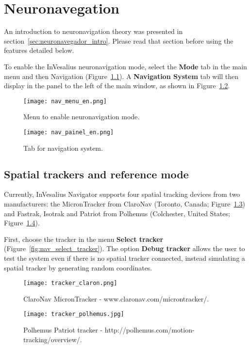 \chapter{Neuronavegation}
\label{sec:neuronavegador}

An introduction to neuronavigation theory was presented in section~\ref{sec:neuronavegador_intro}. Please read that section before using the features detailed below.

To enable the InVesalius neuronavigation mode, select the \textbf{Mode} tab in the main menu and then Navigation (Figure~\ref{fig:nav_menu_en}). A \textbf{Navigation System} tab will then display in the panel to the left of the main window, as shown in Figure~\ref{fig:nav_painel_en}.

\begin{figure}[!htb]
\centering
\texttt{[image: nav\_menu\_en.png]}
\caption{Menu to enable neuronavigation mode.}
\label{fig:nav_menu_en}
\end{figure}

\begin{figure}[!htb]
\centering
\texttt{[image: nav\_painel\_en.png]}
\caption{Tab for navigation system.}
\label{fig:nav_painel_en}
\end{figure}

\section{Spatial trackers and reference mode}

Currently, InVesalius Navigator supports four spatial tracking devices from two manufacturers: the MicronTracker from ClaroNav (Toronto, Canada; Figure~\ref{fig:tracker_claron}) and Fastrak, Isotrak and Patriot from Polhemus (Colchester, United States; Figure~\ref{fig:tracker_polhemus}).

First, choose the tracker in the menu \textbf{Select tracker} (Figure~\ref{fig:nav_select_tracker}). The option \textbf{Debug tracker} allows the user to test the system even if there is no spatial tracker connected, instead simulating a spatial tracker by generating random coordinates.

\begin{figure}[!htb]
\centering
\texttt{[image: tracker\_claron.png]}
\caption{ClaroNav MicronTracker - www.claronav.com/microntracker/.}
\label{fig:tracker_claron}
\end{figure}

\begin{figure}[!htb]
\centering
\texttt{[image: tracker\_polhemus.jpg]}
\caption{Polhemus Patriot tracker - http://polhemus.com/motion-tracking/overview/.}
\label{fig:tracker_polhemus}
\end{figure}


